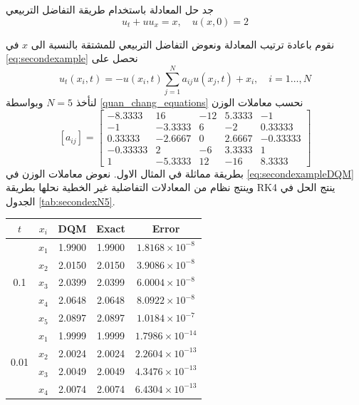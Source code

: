 \begin{example}
	جد حل المعادلة باستخدام طريقة التفاضل التربيعي 
\begin{equation}
	\label{eq:secondexample}
		u_t + u u_x = x, \quad u(x, 0) = 2
\end{equation}
\end{example}
\begin{solution}
	نقوم باعادة  ترتيب المعادلة ونعوض التفاضل التربيعي للمشتقة بالنسبة الى $x$ في \eqref{eq:secondexample} نحصل على 
	\begin{equation}
		\label{eq:secondexampleDQM}
		u_t(x_i, t) = - u(x_i, t) \sum_{j=1}^{N} a_{ij} u(x_j, t) + x_i,\quad i =1\dots,N 
	\end{equation}
	لنأخذ $N=5$ وبواسطة \eqref{quan_chang_equations} نحسب معاملات الوزن 
\[
[a_{ij}] =
\begin{bmatrix}
	-8.3333 & 16 & -12 & 5.3333 & -1 \\
	-1 & -3.3333 & 6 & -2 & 0.33333 \\
	0.33333 & -2.6667 & 0 & 2.6667 & -0.33333 \\
	-0.33333 & 2 & -6 & 3.3333 & 1 \\
	1 & -5.3333 & 12 & -16 & 8.3333
\end{bmatrix}
\]
بطريقة مماثلة في المثال الاول. نعوض معاملات الوزن في \eqref{eq:secondexampleDQM} وينتج نظام من المعادلات التفاضلية غير الخطية نحلها بطريقة RK4 ينتج الحل في الجدول \ref{tab:secondexN5}.
\begin{english}
	\begin{table}[h!]
	\centering
	\begin{tabular}{|c|c|c|c|c|}
		\hline
		$t$ & $x_i$ & DQM & Exact & Error \\
		\hline
		\multirow{5}{*}{0.1} & $x_1$ & 1.9900 & 1.9900 & $1.8168 \times 10^{-8}$ \\
		& $x_2$ & 2.0150 & 2.0150 & $3.9086 \times 10^{-8}$ \\
		& $x_3$ & 2.0399 & 2.0399 & $6.0004 \times 10^{-8}$ \\
		& $x_4$ & 2.0648 & 2.0648 & $8.0922 \times 10^{-8}$ \\
		& $x_5$ & 2.0897 & 2.0897 & $1.0184 \times 10^{-7}$ \\
		\hline
		\multirow{5}{*}{0.01} & $x_1$ & 1.9999 & 1.9999 & $1.7986 \times 10^{-14}$ \\
		& $x_2$ & 2.0024 & 2.0024 & $2.2604 \times 10^{-13}$ \\
		& $x_3$ & 2.0049 & 2.0049 & $4.3476 \times 10^{-13}$ \\
		& $x_4$ & 2.0074 & 2.0074 & $6.4304 \times 10^{-13}$ \\

\end{tabular}
\end{table}
\end{english}
\end{solution}
